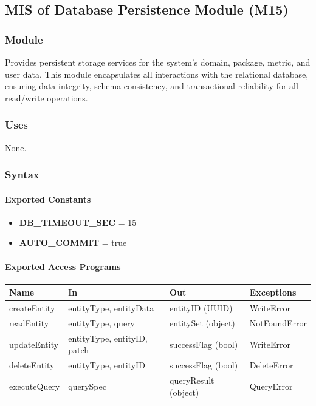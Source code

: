 \documentclass[12pt, titlepage]{article}
\begin{document}
\begin{itemize}
\subsection{MIS of Database Persistence Module (M15)}
  \label{mis:DatabasePersistenceModule}

  \subsubsection{Module}
  Provides persistent storage services for the system's domain, package, metric, and user data.
  This module encapsulates all interactions with the relational database, ensuring data integrity,
  schema consistency, and transactional reliability for all read/write operations.

  \subsubsection{Uses}
  None.

  \subsubsection{Syntax}

  \paragraph{Exported Constants}
  \begin{itemize}
    \item \textbf{DB\_TIMEOUT\_SEC} = 15
    \item \textbf{AUTO\_COMMIT} = true
  \end{itemize}

  \paragraph{Exported Access Programs}
  \begin{center}
  \renewcommand{\arraystretch}{1.2}
  \begin{tabularx}{\textwidth}{l X X l}
  \toprule
  \textbf{Name} & \textbf{In} & \textbf{Out} & \textbf{Exceptions}\\
  \midrule
  createEntity & entityType, entityData & entityID (UUID) & WriteError \\
  readEntity & entityType, query & entitySet (object) & NotFoundError \\
  updateEntity & entityType, entityID, patch & successFlag (bool) & WriteError \\
  deleteEntity & entityType, entityID & successFlag (bool) & DeleteError \\
  executeQuery & querySpec & queryResult (object) & QueryError \\
  \bottomrule
  \end{tabularx}
  \end{center}


\end{itemize}
\end{document}
